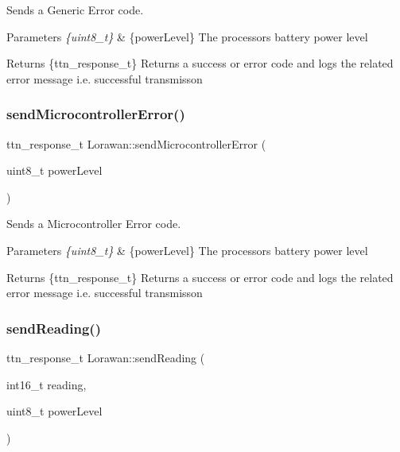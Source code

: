 Sends a Generic Error code. 
\begin{DoxyParams}{Parameters}
{\em \{uint8\+\_\+t\}} & \{power\+Level\} The processor\textquotesingle{}s battery power level \\
\hline
\end{DoxyParams}
\begin{DoxyReturn}{Returns}
\{ttn\+\_\+response\+\_\+t\} Returns a success or error code and logs the related error message i.\+e. \textquotesingle{}successful transmisson\textquotesingle{} 
\end{DoxyReturn}
\mbox{\label{class_lorawan_ac57100cd65b5f9f5aea4e0cd8c24dd12}} 
\subsubsection{\texorpdfstring{send\+Microcontroller\+Error()}{sendMicrocontrollerError()}}
{\footnotesize\ttfamily ttn\+\_\+response\+\_\+t Lorawan\+::send\+Microcontroller\+Error (\begin{DoxyParamCaption}\item[{uint8\+\_\+t}]{power\+Level }\end{DoxyParamCaption})}

Sends a Microcontroller Error code. 
\begin{DoxyParams}{Parameters}
{\em \{uint8\+\_\+t\}} & \{power\+Level\} The processor\textquotesingle{}s battery power level \\
\hline
\end{DoxyParams}
\begin{DoxyReturn}{Returns}
\{ttn\+\_\+response\+\_\+t\} Returns a success or error code and logs the related error message i.\+e. \textquotesingle{}successful transmisson\textquotesingle{} 
\end{DoxyReturn}
\mbox{\label{class_lorawan_a0a82173d537813a749766aec6ae58fe8}} 
\subsubsection{\texorpdfstring{send\+Reading()}{sendReading()}}
{\footnotesize\ttfamily ttn\+\_\+response\+\_\+t Lorawan\+::send\+Reading (\begin{DoxyParamCaption}\item[{int16\+\_\+t}]{reading,  }\item[{uint8\+\_\+t}]{power\+Level }\end{DoxyParamCaption})}


